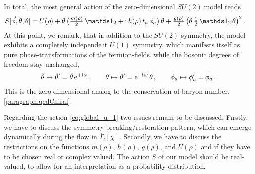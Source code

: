 In total, the most general action of the zero-dimensional $SU(2)$ model reads
	\begin{align}
		{S}[\vec{\phi},\theta,\bar{\theta}] = \, & U(\rho) + \bar{\theta} \, \big( \tfrac{m(\rho)}{2} \, \Id_2 + \mathrm{i}\, h(\rho) \, \suIIt{a}\, \phi_a \big) \, \theta + \tfrac{g(\rho)}{2} \, \big( \bar{\theta} \, \tfrac{1}{2} \, \Id_2 \, \theta \big)^2 \,.\label{eq:full_su2_action}
	\end{align}
	At this point, we remark, that in addition to the $SU(2)$ symmetry, the model exhibits a completely independent $U(1)$ symmetry, which manifests itself as pure phase-transformations of the fermion-fields, while the bosonic degrees of freedom stay unchanged,
		\begin{align}
			\bar{\theta} \mapsto \bar{\theta}^\prime = \bar{\theta} \, \eu^{ + \iu\vts \omega} \,,	\qquad	\theta \mapsto \theta^\prime = \eu^{ - \iu\vts \omega } \, \theta \,, \qquad	\phi_a \mapsto \phi^\prime_a = \phi_a \,.	\label{eq:global_u_1}
		\end{align}
	This is the zero-dimensional analog to the conservation of baryon number, \cf{} \cref{paragraph:qcdChiral}.
	
	Regarding the action \eqref{eq:global_u_1} two issues remain to be discussed: Firstly, we have to discuss the symmetry breaking/restoration pattern, which can emerge dynamically during the \frg{} flow in $\bar{\Gamma}_t[\chi]$. Secondly, we have to discuss the restrictions on the functions $m(\rho)$, $h(\rho)$, $g(\rho)$, and $U(\rho)$ and if they have to be chosen real or complex valued. 
	The action $S$ of our model should be real-valued, to allow for an interpretation as a probability distribution.


